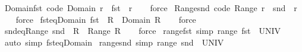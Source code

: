 \begin{isabellebody}
\isanewline
{}\isamarkupfalse%
\ Domain{\isacharunderscore}{\kern0pt}fst\ {\isacharbrackleft}{\kern0pt}code{\isacharbrackright}{\kern0pt}{\isacharcolon}{\kern0pt}\ {\isachardoublequoteopen}Domain\ r\ {\isacharequal}{\kern0pt}\ fst\ {\isacharbackquote}{\kern0pt}\ r{\isachardoublequoteclose}\isanewline
%
\isadelimproof
\ \ %
\endisadelimproof
%
\isatagproof
{}\isamarkupfalse%
\ force%
\endisatagproof
{\isafoldproof}%
%
\isadelimproof
\isanewline
%
\endisadelimproof
\isanewline
{}\isamarkupfalse%
\ Range{\isacharunderscore}{\kern0pt}snd\ {\isacharbrackleft}{\kern0pt}code{\isacharbrackright}{\kern0pt}{\isacharcolon}{\kern0pt}\ {\isachardoublequoteopen}Range\ r\ {\isacharequal}{\kern0pt}\ snd\ {\isacharbackquote}{\kern0pt}\ r{\isachardoublequoteclose}\isanewline
%
\isadelimproof
\ \ %
\endisadelimproof
%
\isatagproof
{}\isamarkupfalse%
\ force%
\endisatagproof
{\isafoldproof}%
%
\isadelimproof
\isanewline
%
\endisadelimproof
\isanewline
{}\isamarkupfalse%
\ fst{\isacharunderscore}{\kern0pt}eq{\isacharunderscore}{\kern0pt}Domain{\isacharcolon}{\kern0pt}\ {\isachardoublequoteopen}fst\ {\isacharbackquote}{\kern0pt}\ R\ {\isacharequal}{\kern0pt}\ Domain\ R{\isachardoublequoteclose}\isanewline
%
\isadelimproof
\ \ %
\endisadelimproof
%
\isatagproof
{}\isamarkupfalse%
\ force%
\endisatagproof
{\isafoldproof}%
%
\isadelimproof
\isanewline
%
\endisadelimproof
\isanewline
{}\isamarkupfalse%
\ snd{\isacharunderscore}{\kern0pt}eq{\isacharunderscore}{\kern0pt}Range{\isacharcolon}{\kern0pt}\ {\isachardoublequoteopen}snd\ {\isacharbackquote}{\kern0pt}\ R\ {\isacharequal}{\kern0pt}\ Range\ R{\isachardoublequoteclose}\isanewline
%
\isadelimproof
\ \ %
\endisadelimproof
%
\isatagproof
{}\isamarkupfalse%
\ force%
\endisatagproof
{\isafoldproof}%
%
\isadelimproof
\isanewline
%
\endisadelimproof
\isanewline
{}\isamarkupfalse%
\ range{\isacharunderscore}{\kern0pt}fst\ {\isacharbrackleft}{\kern0pt}simp{\isacharbrackright}{\kern0pt}{\isacharcolon}{\kern0pt}\ {\isachardoublequoteopen}range\ fst\ {\isacharequal}{\kern0pt}\ UNIV{\isachardoublequoteclose}\isanewline
%
\isadelimproof
\ \ %
\endisadelimproof
%
\isatagproof
{}\isamarkupfalse%
\ {\isacharparenleft}{\kern0pt}auto\ simp{\isacharcolon}{\kern0pt}\ fst{\isacharunderscore}{\kern0pt}eq{\isacharunderscore}{\kern0pt}Domain{\isacharparenright}{\kern0pt}%
\endisatagproof
{\isafoldproof}%
%
\isadelimproof
\isanewline
%
\endisadelimproof
\isanewline
{}\isamarkupfalse%
\ range{\isacharunderscore}{\kern0pt}snd\ {\isacharbrackleft}{\kern0pt}simp{\isacharbrackright}{\kern0pt}{\isacharcolon}{\kern0pt}\ {\isachardoublequoteopen}range\ snd\ {\isacharequal}{\kern0pt}\ UNIV{\isachardoublequoteclose}\isanewline

\end{isabellebody}
